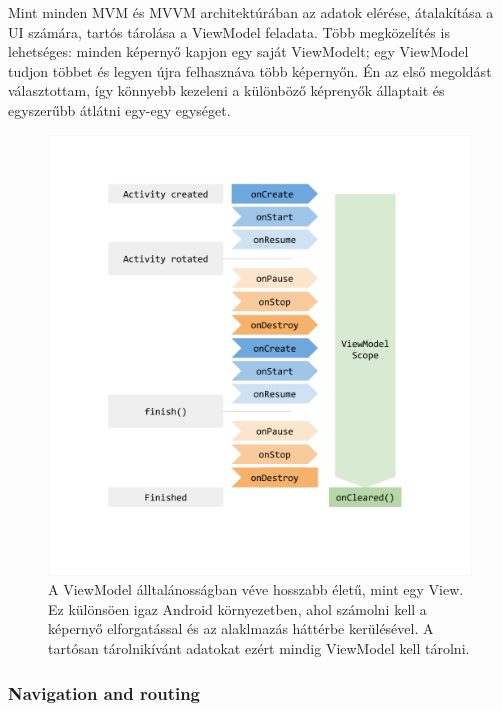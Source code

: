 Mint minden MVM és MVVM architektúrában az adatok elérése, átalakítása a UI számára, tartós tárolása a ViewModel feladata.
Több megközelítés is lehetséges: minden képernyő kapjon egy saját ViewModelt; egy ViewModel tudjon többet és legyen újra felhasznáva több képernyőn.
Én az első megoldást választottam, így könnyebb kezeleni a különböző képrenyők állaptait és egyszerűbb átlátni egy-egy egységet.

\begin{figure}[!ht]
    \centering
    \includegraphics[width=150mm, keepaspectratio]{figures/viewmodel-lifecycle.png}
    \caption{A ViewModel álltalánosságban véve hosszabb életű, mint egy View. Ez különsöen igaz Android környezetben, ahol számolni kell a képernyő elforgatással és az alaklmazás háttérbe kerülésével. A tartósan tárolnikívánt adatokat ezért mindig ViewModel kell tárolni. \cite{ViewModelAndroid}}
    \label{fig:ViewModel}
\end{figure}

\subsubsection{Navigation and routing}
\label{sec:Navigation}

